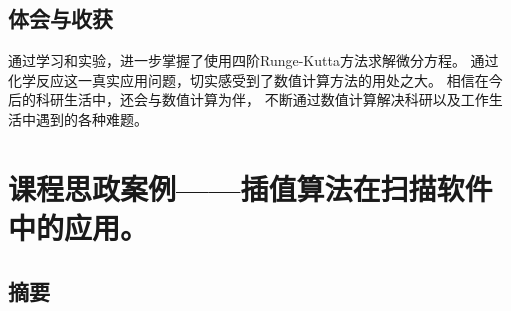 \documentclass{article}
\begin{document}
\subsection{体会与收获}
通过学习和实验，进一步掌握了使用四阶Runge-Kutta方法求解微分方程。
通过化学反应这一真实应用问题，切实感受到了数值计算方法的用处之大。
相信在今后的科研生活中，还会与数值计算为伴，
不断通过数值计算解决科研以及工作生活中遇到的各种难题。

\newpage
\section{课程思政案例——插值算法在扫描软件中的应用。}
\subsection{摘要}
\end{document}
